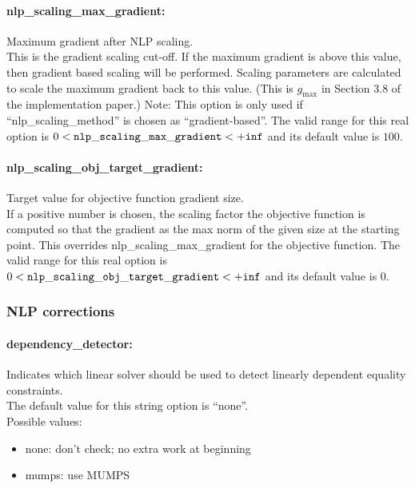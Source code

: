 \paragraph{nlp\_scaling\_max\_gradient:} Maximum gradient after NLP scaling. $\;$ \\
 This is the gradient scaling cut-off. If the
maximum gradient is above this value, then
gradient based scaling will be performed. Scaling
parameters are calculated to scale the maximum
gradient back to this value. (This is $g_{\max}$ in
Section 3.8 of the implementation paper.) Note:
This option is only used if
``nlp\_scaling\_method'' is chosen as
``gradient-based''. The valid range for this real option is 
$0 <  {\tt nlp\_scaling\_max\_gradient } <  {\tt +inf}$
and its default value is $100$.

\paragraph{nlp\_scaling\_obj\_target\_gradient:} Target value for objective function gradient size. $\;$ \\
     If a positive number is chosen, the scaling factor the objective function
     is computed so that the gradient as the max norm of the given size at the
     starting point.  This overrides nlp\_scaling\_max\_gradient for the
     objective function.
The valid range for this real option is 
$0 <  {\tt nlp\_scaling\_obj\_target\_gradient } <  {\tt +inf}$
and its default value is $0$.

\subsubsection{NLP corrections}

\paragraph{dependency\_detector:} Indicates which linear solver should be used to detect linearly dependent equality constraints. $\;$ \\
The default value for this string option is ``none''.
\\ 
Possible values:
\begin{itemize}
\item none:                    don't check; no extra work at beginning
\item mumps:                   use MUMPS
\end{itemize}

